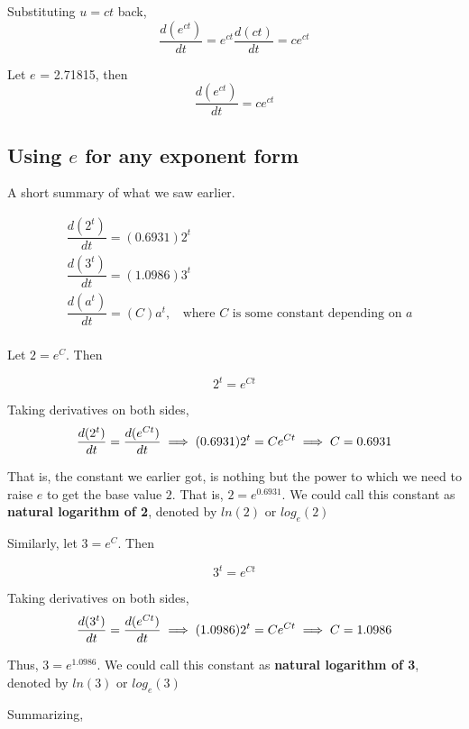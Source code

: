 \documentclass[float=false,crop=false]{standalone}
\begin{document}
Substituting \(u=ct\) back, \[
\dfrac{d(e^{ct})}{dt} =  e^{ct}\dfrac{d(ct)}{dt} = ce^{ct}
\]
\begin{tcolorbox}[colback=green!5,colframe=green!40!black,title=The derivative of $e^{ct}$]
Let $e$ = 2.71815, then
\begin{equation}
    \dfrac{d(e^{ct})}{dt} = ce^{ct}  \label{eq:MA02}
\end{equation}
\end{tcolorbox}
    \subsection{\texorpdfstring{Using \(e\) for any exponent
form}{Using e for any exponent form}}\label{using-e-for-any-exponent-form}

A short summary of what we saw earlier.

\[
\begin{aligned}
& \dfrac{d(2^t)}{dt} = (0.6931)2^t \\
& \dfrac{d(3^t)}{dt} = (1.0986)3^t \\
& \dfrac{d(a^t)}{dt} = (C)a^t , \ \ \ \ \text{where $C$ is some constant depending on $a$} \\
\end{aligned}
\]

Let \(2 = e^C\). Then

\[
2^t = e^{Ct}
\]

Taking derivatives on both sides, \[
\dfrac{d(2^t)}{dt} = \dfrac{ d(e^{Ct}) }{dt} \\
\implies (0.6931)2^t = Ce^{Ct} \\
\implies C = 0.6931
\]

That is, the constant we earlier got, is nothing but the power to which
we need to raise \(e\) to get the base value \(2\). That is,
\(2 = e^{0.6931}\). We could call this constant as \textbf{natural
logarithm of 2}, denoted by \(ln(2)\) or \(log_e(2)\)

Similarly, let \(3 = e^C\). Then

\[
3^t = e^{Ct}
\]

Taking derivatives on both sides, \[
\dfrac{d(3^t)}{dt} = \dfrac{ d(e^{Ct}) }{dt} \\
\implies (1.0986)2^t = Ce^{Ct} \\
\implies C = 1.0986
\]

Thus, \(3 = e^{1.0986}\). We could call this constant as \textbf{natural
logarithm of 3}, denoted by \(ln(3)\) or \(log_e(3)\)

Summarizing,
\end{document}
